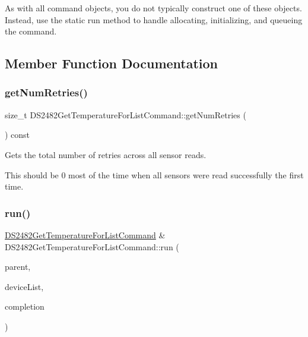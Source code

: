 As with all command objects, you do not typically construct one of these objects. Instead, use the static run method to handle allocating, initializing, and queueing the command. 

\subsection{Member Function Documentation}
\mbox{\label{class_d_s2482_get_temperature_for_list_command_a962f91c29fa4a2a1d5c02ab2f4c120a9}} 
\subsubsection{\texorpdfstring{get\+Num\+Retries()}{getNumRetries()}}
{\footnotesize\ttfamily size\+\_\+t D\+S2482\+Get\+Temperature\+For\+List\+Command\+::get\+Num\+Retries (\begin{DoxyParamCaption}{ }\end{DoxyParamCaption}) const\hspace{0.3cm}{\ttfamily [inline]}}



Gets the total number of retries across all sensor reads. 

This should be 0 most of the time when all sensors were read successfully the first time. \mbox{\label{class_d_s2482_get_temperature_for_list_command_ad0895d68b4409b157891b751e740b4fe}} 
\subsubsection{\texorpdfstring{run()}{run()}}
{\footnotesize\ttfamily \mbox{\hyperlink{class_d_s2482_get_temperature_for_list_command}{D\+S2482\+Get\+Temperature\+For\+List\+Command}} \& D\+S2482\+Get\+Temperature\+For\+List\+Command\+::run (\begin{DoxyParamCaption}\item[{\mbox{\hyperlink{class_d_s2482}{D\+S2482}} \&}]{parent,  }\item[{\mbox{\hyperlink{class_d_s2482_device_list}{D\+S2482\+Device\+List}} \&}]{device\+List,  }\item[{std\+::function$<$ void(\mbox{\hyperlink{class_d_s2482_get_temperature_for_list_command}{D\+S2482\+Get\+Temperature\+For\+List\+Command}} \&, int status, \mbox{\hyperlink{class_d_s2482_device_list}{D\+S2482\+Device\+List}} \&device\+List)$>$}]{completion }\end{DoxyParamCaption})\hspace{0.3cm}{\ttfamily [static]}}



